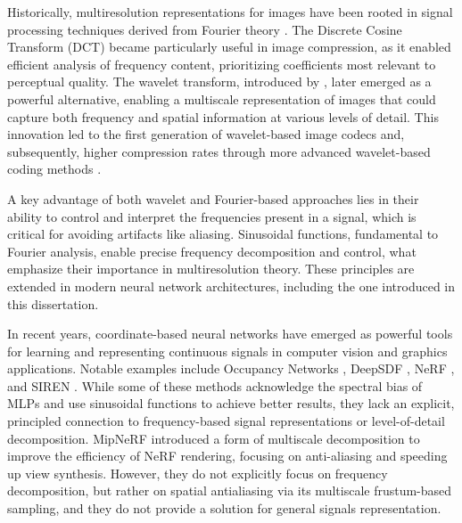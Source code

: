 Historically, multiresolution representations for images have been rooted in signal processing techniques derived from Fourier theory \citep{bracewell1986fourier}. The Discrete Cosine Transform (DCT) \citep{dct-og} became particularly useful in image compression, as it enabled efficient analysis of frequency content, prioritizing coefficients most relevant to perceptual quality. The wavelet transform, introduced by \citet{mallat1989theory}, later emerged as a powerful alternative, enabling a multiscale representation of images that could capture both frequency and spatial information at various levels of detail. This innovation led to the first generation of wavelet-based image codecs \citep{antonini1992image} and, subsequently, higher compression rates through more advanced wavelet-based coding methods \citep{mallat-2gen}.

A key advantage of both wavelet and Fourier-based approaches lies in their ability to control and interpret the frequencies present in a signal, which is critical for avoiding artifacts like aliasing. Sinusoidal functions, fundamental to Fourier analysis, enable precise frequency decomposition and control, what emphasize their importance in multiresolution theory. These principles are extended in modern neural network architectures, including the one introduced in this dissertation.

In recent years, coordinate-based neural networks have emerged as powerful tools for learning and representing continuous signals in computer vision and graphics applications. Notable examples include Occupancy Networks \citep{occupancy_networks}, DeepSDF \citep{park2019deepsdf}, NeRF \citep{2020nerf}, and SIREN \citep{sitzmann2019siren}. While some of these methods acknowledge the spectral bias of MLPs and use sinusoidal functions to achieve better results, they lack an explicit, principled connection to frequency-based signal representations or level-of-detail decomposition. MipNeRF \citep{barron2022mipnerf360} introduced a form of multiscale decomposition to improve the efficiency of NeRF rendering, focusing on anti-aliasing and speeding up view synthesis. However, they do not explicitly focus on frequency decomposition, but rather on spatial antialiasing via its multiscale frustum-based sampling, and they do not provide a solution for general signals representation.


